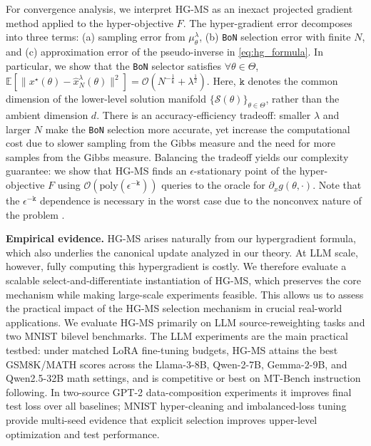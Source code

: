 \documentclass{article}
\theoremstyle{normaltheorem}
\newcommand{\hyperobjective}{F}
\newcommand{\gibbs}{\mu}
\newcommand{\gibbstheta}{\gibbs_\theta^\lambda}
\newcommand{\poly}{\text{poly}}
\newcommand{\dimk}{\texttt{k}}
\newcommand{\calS}{\mathcal{S}}
\newcommand{\BoN}{\texttt{BoN}\xspace}
\begin{document}
    
For convergence analysis, we interpret \textsc{HG-MS} as an inexact projected gradient method applied to the hyper-objective \(F\). The hyper-gradient error decomposes into three terms: (a) sampling error from \(\gibbstheta\), (b) \BoN selection error with finite \(N\), and (c) approximation error of the pseudo-inverse in \cref{eq:hg_formula}.  In particular, we show that the \BoN selector satisfies $\forall \theta \in \Theta$, $\mathbb{E}[\|x^\star(\theta) - \hat{x}_N^\lambda(\theta)\|^2] = \mathcal{O}(N^{-\frac{1}{\dimk}} + \lambda^{\frac{1}{2}}).$
 Here, $\dimk$ denotes the common dimension of the lower-level solution manifold $\{\calS(\theta)\}_{\theta \in \Theta}$,  rather than the ambient dimension $d$. There is an accuracy-efficiency tradeoff:  smaller \(\lambda\) and larger \(N\) make the \BoN selection more accurate, yet increase the  computational cost due to slower sampling from the Gibbs measure and the need for more samples from the Gibbs measure.  Balancing the tradeoff yields our complexity guarantee: we show that \textsc{HG-MS} finds an $\epsilon$-stationary point of the hyper-objective $\hyperobjective$ using $\mathcal{O}(\poly(\epsilon^{-\dimk}))$  queries to the oracle for $\partial_x g(\theta,\cdot)$. Note that the $\epsilon^{-\dimk}$ dependence is necessary in the worst case due to the nonconvex nature of the problem \citep{nemirovskij1983problem}.


\textbf{Empirical evidence.} 
HG-MS arises naturally from our hypergradient formula, which also underlies the canonical update analyzed in our theory. At LLM scale, however, fully computing this hypergradient is costly. We therefore evaluate a scalable select-and-differentiate instantiation of HG-MS, which preserves the core mechanism while making large-scale experiments feasible. This allows us to assess the practical impact of the HG-MS selection mechanism in crucial real-world applications.
We evaluate HG-MS primarily on LLM source-reweighting tasks and two MNIST bilevel benchmarks. The LLM experiments are the main practical testbed: under matched LoRA fine-tuning budgets, HG-MS attains the best GSM8K/MATH scores across the Llama-3-8B, Qwen-2-7B, Gemma-2-9B, and Qwen2.5-32B math settings, and is competitive or best on MT-Bench instruction following. In two-source GPT-2 data-composition experiments it improves final test loss over all baselines; MNIST hyper-cleaning \citep{ren2018reweight} and imbalanced-loss tuning provide multi-seed evidence that explicit selection improves upper-level optimization and test performance.
\end{document}
